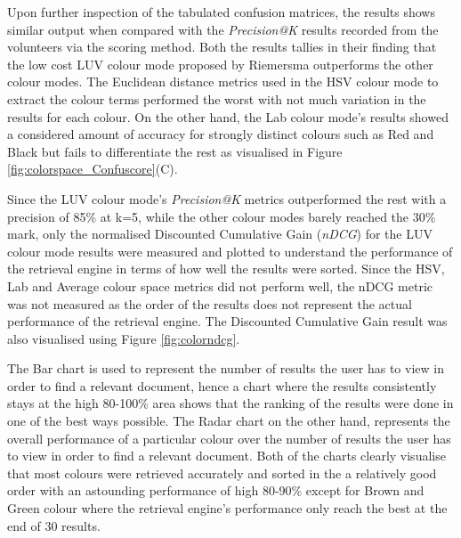Upon further inspection of the tabulated confusion matrices, the results shows similar output when compared with the \textit{Precision@K} results recorded from the volunteers via the scoring method. Both the results tallies in their finding that the low cost LUV colour mode proposed by Riemersma\cite{riemersma} outperforms the other colour modes. The Euclidean distance metrics used in the HSV colour mode to extract the colour terms performed the worst with not much variation in the results for each colour. On the other hand, the Lab colour mode's results showed a considered amount of accuracy for strongly distinct colours such as Red and Black but fails to differentiate the rest as visualised in Figure \ref{fig:colorspace_Confuscore}(C). 

Since the LUV colour mode's \textit{Precision@K} metrics outperformed the rest with a precision of 85\% at k=5, while the other colour modes barely reached the 30\% mark, only the normalised Discounted Cumulative Gain (\textit{nDCG}) for the LUV colour mode results were measured and plotted to understand the performance of the retrieval engine in terms of how well the results were sorted. Since the HSV, Lab and Average colour space metrics did not perform well, the nDCG metric was not measured as the order of the results does not represent the actual performance of the retrieval engine. The Discounted Cumulative Gain result was also visualised using Figure \ref{fig:colorndcg}.

The Bar chart is used to represent the number of results the user has to view in order to find a relevant document, hence a chart where the results consistently stays at the high 80-100\% area shows that the ranking of the results were done in one of the best ways possible. The Radar chart on the other hand, represents the overall performance of a particular colour over the number of results the user has to view in order to find a relevant document. Both of the charts clearly visualise that most colours were retrieved accurately and sorted in the a relatively good order with an astounding performance of high 80-90\% except for Brown and Green colour where the retrieval engine's performance only reach the best at the end of 30 results.


